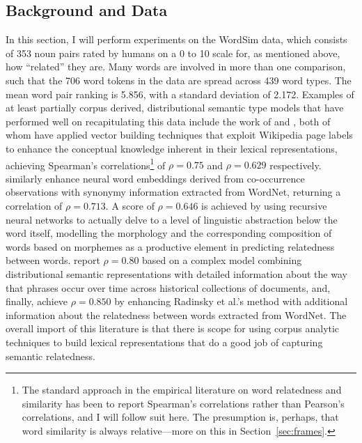 \subsection{Background and Data}
In this section, I will perform experiments on the WordSim data, which consists of 353 noun pairs rated by humans on a 0 to 10 scale for, as mentioned above, how ``related'' they are.  Many words are involved in more than one comparison, such that the 706 word tokens in the data are spread across 439 word types.  The mean word pair ranking is 5.856, with a standard deviation of 2.172.  Examples of at least partially corpus derived, distributional semantic type models that have performed well on recapitulating this data include the work of \cite{GabrilovichEA2007} and \cite{HassanEA2011}, both of whom have applied vector building techniques that exploit Wikipedia page labels to enhance the conceptual knowledge inherent in their lexical representations, achieving Spearman's correlations\footnote{The standard approach in the empirical literature on word relatedness and similarity has been to report Spearman's correlations rather than Pearson's correlations, and I will follow suit here.  The presumption is, perhaps, that word similarity is always relative---more on this in Section~\ref{sec:frames}.} of $\rho = 0.75$ and $\rho = 0.629$ respectively.  \cite{HuangEA2012} similarly enhance neural word embeddings derived from co-occurrence observations with synonymy information extracted from WordNet, returning a correlation of $\rho = 0.713$.  A score of $\rho = 0.646$ is achieved by \cite{LuongEA2013} using recursive neural networks to actually delve to a level of linguistic abstraction below the word itself, modelling the morphology and the corresponding composition of words based on morphemes as a productive element in predicting relatedness between words.  \cite{RadinskyEA2011} report $\rho = 0.80$ based on a complex model combining distributional semantic representations with detailed information about the way that phrases occur over time across historical collections of documents, and, finally, \cite{HalawiEA2012} achieve $\rho = 0.850$ by enhancing Radinsky et al.'s method with additional information about the relatedness between words extracted from WordNet.  The overall import of this literature is that there is scope for using corpus analytic techniques to build lexical representations that do a good job of capturing semantic relatedness.


